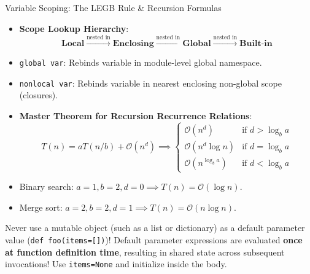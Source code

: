 \begin{formulabox}{Variable Scoping: The LEGB Rule \& Recursion Formulas}
\begin{itemize}[leftmargin=1.5em, itemsep=2pt]
    \item \textbf{Scope Lookup Hierarchy}:
    \begin{equation*}
    \textbf{Local} \xrightarrow{\text{nested in}} \textbf{Enclosing} \xrightarrow{\text{nested in}} \textbf{Global} \xrightarrow{\text{nested in}} \textbf{Built-in}
    \end{equation*}
    \item \texttt{global var}: Rebinds variable in module-level global namespace.
    \item \texttt{nonlocal var}: Rebinds variable in nearest enclosing non-global scope (closures).
    \item \textbf{Master Theorem for Recursion Recurrence Relations}:
    \begin{equation*}
    T(n) = a T(n/b) + \mathcal{O}(n^d) \implies
    \begin{cases}
    \mathcal{O}(n^d) & \text{if } d > \log_b a \\
    \mathcal{O}(n^d \log n) & \text{if } d = \log_b a \\
    \mathcal{O}(n^{\log_b a}) & \text{if } d < \log_b a
    \end{cases}
    \end{equation*}
    \item Binary search: $a=1, b=2, d=0 \implies T(n) = \mathcal{O}(\log n)$.
    \item Merge sort: $a=2, b=2, d=1 \implies T(n) = \mathcal{O}(n \log n)$.
\end{itemize}
\end{formulabox}

\begin{memorytip}
Never use a mutable object (such as a list or dictionary) as a default parameter value (\texttt{def foo(items=[])})! Default parameter expressions are evaluated \textbf{once at function definition time}, resulting in shared state across subsequent invocations! Use \texttt{items=None} and initialize inside the body.
\end{memorytip}
